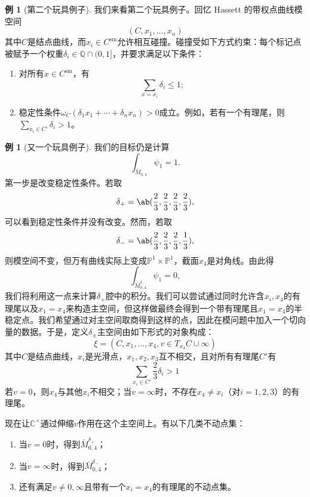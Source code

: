 \documentclass{amsart}
\theoremstyle{definition}
\newtheorem{exm}[thm]{例}
\theoremstyle{remark}
\theoremstyle{plain}
\theoremstyle{definition}
\theoremstyle{remark}
\newcommand{\C}{\mathbb{C}}
\newcommand{\Q}{\mathbb{Q}}
\renewcommand{\P}{\mathbb{P}}
\newcommand{\mr}[1]{\mathrm{#1}}
\newcommand{\1}{\mathbf{1}}
\newcommand{\2}{\mathbf{2}}
\newcommand{\3}{\mathbf{3}}
\begin{document}
\begin{exm}[第二个玩具例子]
    我们来看第二个玩具例子。回忆 Hassett 的带权点曲线模空间
    \[ (C, x_1, \ldots, x_n) \]
    其中\(C\)是结点曲线，而\(x_i \in C^{\mr{sm}}\)允许相互碰撞。碰撞受如下方式约束：每个标记点被赋予一个权重\(\delta_i \in \Q \cap (0,1]\)，并要求满足以下条件：
    \begin{enumerate}
        \item 对所有\(x \in C^{\mr{sm}}\)，有
            \[ \sum_{x = x_i} \delta_i \leq 1; \]
        \item 稳定性条件\(\omega_C(\delta_1 x_1 + \cdots + \delta_n x_n) > 0\)成立。例如，若有一个有理尾，则\(\sum_{x_i \in C'} \delta_i > 1\)。
    \end{enumerate}
\end{exm}

\begin{exm}[又一个玩具例子]
    我们的目标仍是计算
    \[ \int_{\bar{M}_{0,4}} \psi_1 = 1. \]
    第一步是改变稳定性条件。若取
    \[ \delta_+ = \ab(\frac{2}{3}, \frac{2}{3}, \frac{2}{3}, \frac{2}{3}), \]
    可以看到稳定性条件并没有改变。然而，若取
    \[ \delta_- = \ab(\frac{2}{3}, \frac{2}{3}, \frac{2}{3}, \frac{1}{3}), \]
    则模空间不变，但万有曲线实际上变成\(\P^1 \times \P^1\)，截面\(x_4\)是对角线。由此得
    \[ \int_{\bar{M}_{0,4}^{\delta_-}} \psi_1 = 0, \]
    我们将利用这一点来计算\(\delta_+\)腔中的积分。我们可以尝试通过同时允许含\(x_i, x_4\)的有理尾以及\(x_1 = x_4\)来构造主空间，但这样做最终会得到一个带有理尾且\(x_1 = x_4\)的半稳定点。我们希望通过对主空间取商得到这样的点，因此在模问题中加入一个切向量的数据。于是，定义\(\delta_{\pm}\)主空间由如下形式的对象构成：
    \[ \xi = (C, x_1, \ldots, x_4, v \in T_{x_4} C \cup \infty) \]
    其中\(C\)是结点曲线，\(x_i\)是光滑点，\(x_1, x_2, x_3\)互不相交，且对所有有理尾\(C'\)有
    \[ \sum_{x_i \in C'} \frac{2}{3} \delta_i > 1 \]
    若\(v = 0\)，则\(x_4\)与其他\(x_i\)不相交；当\(v = \infty\)时，不存在\(x_4 \neq x_i\)（对\(i = 1,2,3\)）的有理尾。

    现在让\(\C^{\times}\)通过伸缩\(v\)作用在这个主空间上。有以下几类不动点集：
    \begin{enumerate}
        \item 当\(v = 0\)时，得到\(\bar{M}_{0,4}^{\delta_+}\)；
        \item 当\(v = \infty\)时，得到\(\bar{M}_{0,4}^{\delta_-}\)；
        \item 还有满足\(v \neq 0,\infty\)且带有一个\(x_i = x_4\)的有理尾的不动点集。
    \end{enumerate}


\end{exm}
\end{document}
